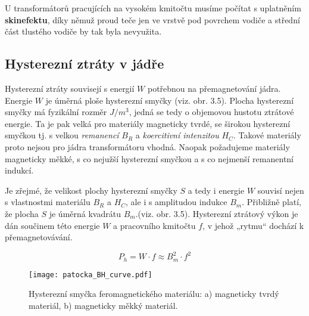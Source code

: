 {      U transformátorů pracujících na vysokém kmitočtu musíme počítat s uplatněním 
      \textbf{skinefektu}, díky němuž proud teče jen ve vrstvě pod povrchem vodiče a střední část 
      tlustého vodiče by tak byla nevyužita.

    \subsection{Hysterezní ztráty v jádře} %
      Hysterezní ztráty souvisejí s energií $W$ potřebnou na přemagnetování jádra. Energie $W$ je 
      úměrná ploše hysterezní smyčky (viz. obr. 3.5). Plocha hysterezní smyčky má fyzikální rozměr 
      $J/m^3$, jedná se tedy o objemovou hustotu ztrátové energie. Ta je pak  velká pro materiály 
      magneticky tvrdé, se širokou hysterezní smyčkou tj. s velkou \emph{remanencí} $B_R$ a 
      \emph{koercitivní intenzitou} $H_C$. Takové materiály proto nejsou pro jádra transformátoru 
      vhodná. Naopak požadujeme materiály magneticky měkké, s co nejužší hysterezní smyčkou a s co 
      nejmenší remanentní indukcí.

      Je zřejmé, že velikost plochy hysterezní smyčky $S$ a tedy i energie $W$ souvisí nejen s 
      vlastnostmi materiálu $B_R$ a $H_C$, ale i s amplitudou indukce $B_m$. Přibližně platí, že 
      plocha $S$ je úměrná kvadrátu $B_m$.(viz. obr. 3.5). Hysterezní ztrátový výkon je dán 
      součinem této energie $W$ a pracovního kmitočtu $f$, v jehož „rytmu“ dochází k 
      přemagnetovávání.

      \begin{equation}\label{ES:eq_hyster_loss}
        P_h = W \cdot f \approx B_m^2 \cdot f^2
      \end{equation}

      \begin{figure}[ht!]
        \centering
        \texttt{[image: patocka\_BH\_curve.pdf]}
        \caption[Hysterezní smyčka feromagnetického materiálu]{Hysterezní smyčka feromagnetického
                 materiálu: a) magneticky tvrdý materiál, b) magneticky měkký materiál.}
        \label{es:fig_BH_curve}
      \end{figure}

}
